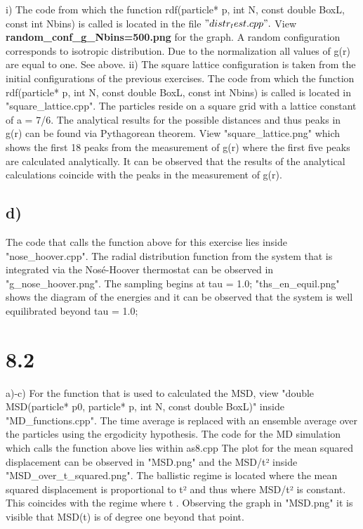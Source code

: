 \documentclass[12pt,a4paper]{article}	%
\newcommand{\x}{\textbf}
\begin{document}
        i)
            The code from which the function rdf(particle* p, int N, const double BoxL, const int Nbins) is called is located in the file $"distr_test.cpp".$
            View \x{random_conf_g_Nbins=500.png} for the graph.
            A random configuration corresponds to isotropic distribution. Due to the normalization all values of g(r) are equal to one. 
            See above. 
        ii)
            The square lattice configuration is taken from the initial configurations of the previous exercises. 
            The code from which the function rdf(particle* p, int N, const double BoxL, const int Nbins) is called is located in "square_lattice.cpp".
            The particles reside on a square grid with a lattice constant of a = 7/6.
            The analytical results for the possible distances and thus peaks in g(r) can be found via Pythagorean theorem.
            View "square_lattice.png" which shows the first 18 peaks from the measurement of g(r) where the first five peaks are 
            calculated analytically. It can be observed that the results of the analytical calculations coincide with the peaks in the
            measurement of g(r). 
        
\subsection{d)}
        The code that calls the function above for this exercise lies inside "nose_hoover.cpp".
        The radial distribution function from the system that is integrated via the Nosé-Hoover thermostat can be observed in "g_nose_hoover.png". 
        The sampling begins at tau = 1.0; 
        "ths_en_equil.png" shows the diagram of the energies and it can be observed that the system is well equilibrated beyond tau = 1.0;

\section{8.2}
    a)-c) 
        For the function that is used to calculated the MSD, view "double MSD(particle* p0, particle* p, int N, const double BoxL)"
        inside "MD_functions.cpp". The time average is replaced with an ensemble average over the particles using the ergodicity hypothesis. 
        The code for the MD simulation which calls the function above lies within as8.cpp
        The plot for the mean squared displacement can be observed in "MSD.png" and the MSD/t² inside "MSD_over_t_squared.png".
        The ballistic regime is located where the mean squared displacement is proportional to t² and thus where MSD/t² is constant. 
        This coincides with the regime where t \in [0, 0.05]. Observing the graph in "MSD.png" it is visible that MSD(t) is of degree one beyond that point. 
\end{document}

